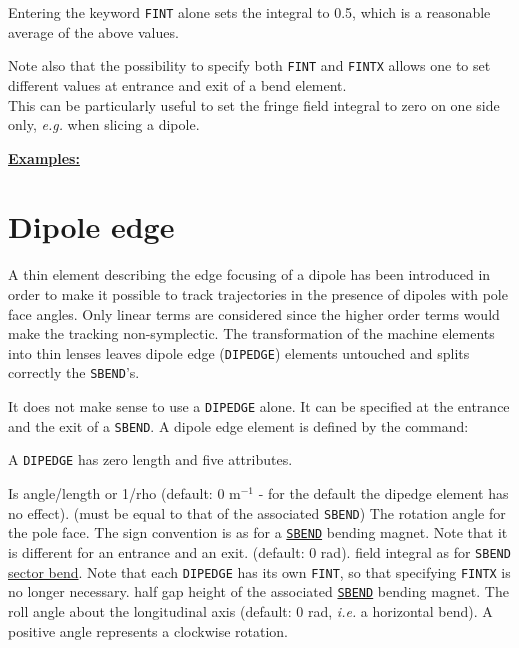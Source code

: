 Entering the keyword \texttt{FINT} alone sets the integral to 0.5, which is a
reasonable average of the above values.

Note also that the possibility to specify both \texttt{FINT} and
\texttt{FINTX} allows one to set different values at entrance and exit
of a bend element. \\
This can be particularly useful to set the fringe field integral to zero
on one side only, \textsl{e.g.} when slicing a dipole.


\textbf{\underline {Examples:}}



\section{Dipole edge}
\label{sec:dipedge}

A thin element describing the edge focusing of a dipole has been
introduced in order to make it possible to track trajectories in the
presence of dipoles with pole face angles. Only linear terms are
considered since the higher order terms would make the tracking
non-symplectic. The transformation of the machine elements into thin
lenses leaves dipole edge (\texttt{DIPEDGE}) elements untouched and splits
correctly the \texttt{SBEND}'s.

It does not make sense to use a \texttt{DIPEDGE} alone.
It can be specified at the entrance and the exit of a \texttt{SBEND}.
A dipole edge element is defined by the command:

A \texttt{DIPEDGE} has zero length and five attributes.
\begin{madlist}
    Is angle/length or 1/rho (default: 0 m$^{-1}$ - for the
     default the dipedge element has no effect). (must be equal to that
     of the associated \texttt{SBEND})
    The rotation angle for the pole face. The sign convention is
     as for a \hyperref[bend-sbend]{\texttt{SBEND}} bending magnet. Note that it is
     different for an entrance and an exit. (default: 0 rad).
    field integral as for \texttt{SBEND}
     \hyperref[F-SBND]{sector bend}. Note that each
     \texttt{DIPEDGE} has its own \texttt{FINT}, so that specifying
     \texttt{FINTX} is no longer necessary.
    half gap height of the associated \hyperref[bend-sbend]{\texttt{SBEND}}
     bending magnet.
    The roll angle about the longitudinal axis (default: 0
     rad, \textsl{i.e.} a horizontal bend). A positive angle represents a
     clockwise rotation.
\end{madlist}



